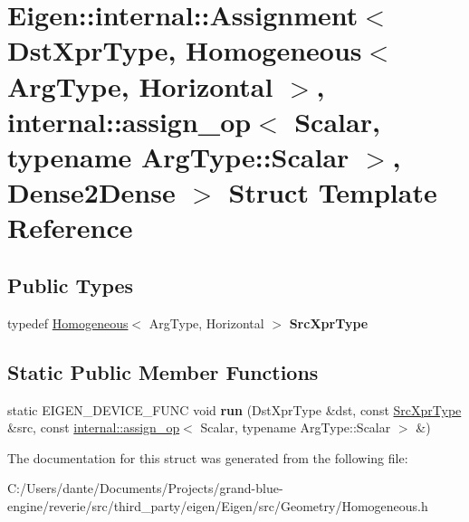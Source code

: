 \hypertarget{struct_eigen_1_1internal_1_1_assignment_3_01_dst_xpr_type_00_01_homogeneous_3_01_arg_type_00_01_bd4940a657c6f656a2015456f5ba4803}{}\section{Eigen\+::internal\+::Assignment$<$ Dst\+Xpr\+Type, Homogeneous$<$ Arg\+Type, Horizontal $>$, internal\+::assign\+\_\+op$<$ Scalar, typename Arg\+Type\+::Scalar $>$, Dense2\+Dense $>$ Struct Template Reference}
\label{struct_eigen_1_1internal_1_1_assignment_3_01_dst_xpr_type_00_01_homogeneous_3_01_arg_type_00_01_bd4940a657c6f656a2015456f5ba4803}
\subsection*{Public Types}
\begin{DoxyCompactItemize}
\item 
\mbox{\label{struct_eigen_1_1internal_1_1_assignment_3_01_dst_xpr_type_00_01_homogeneous_3_01_arg_type_00_01_bd4940a657c6f656a2015456f5ba4803_a97ed740eba73853edafaa9293f2e30bf}} 
typedef \mbox{\hyperlink{class_eigen_1_1_homogeneous}{Homogeneous}}$<$ Arg\+Type, Horizontal $>$ {\bfseries Src\+Xpr\+Type}
\end{DoxyCompactItemize}
\subsection*{Static Public Member Functions}
\begin{DoxyCompactItemize}
\item 
\mbox{\label{struct_eigen_1_1internal_1_1_assignment_3_01_dst_xpr_type_00_01_homogeneous_3_01_arg_type_00_01_bd4940a657c6f656a2015456f5ba4803_af499e5c05f833725f99b695b9d3cbae5}} 
static E\+I\+G\+E\+N\+\_\+\+D\+E\+V\+I\+C\+E\+\_\+\+F\+U\+NC void {\bfseries run} (Dst\+Xpr\+Type \&dst, const \mbox{\hyperlink{class_eigen_1_1_homogeneous}{Src\+Xpr\+Type}} \&src, const \mbox{\hyperlink{struct_eigen_1_1internal_1_1assign__op}{internal\+::assign\+\_\+op}}$<$ Scalar, typename Arg\+Type\+::\+Scalar $>$ \&)
\end{DoxyCompactItemize}


The documentation for this struct was generated from the following file\+:\begin{DoxyCompactItemize}
\item 
C\+:/\+Users/dante/\+Documents/\+Projects/grand-\/blue-\/engine/reverie/src/third\+\_\+party/eigen/\+Eigen/src/\+Geometry/Homogeneous.\+h\end{DoxyCompactItemize}
